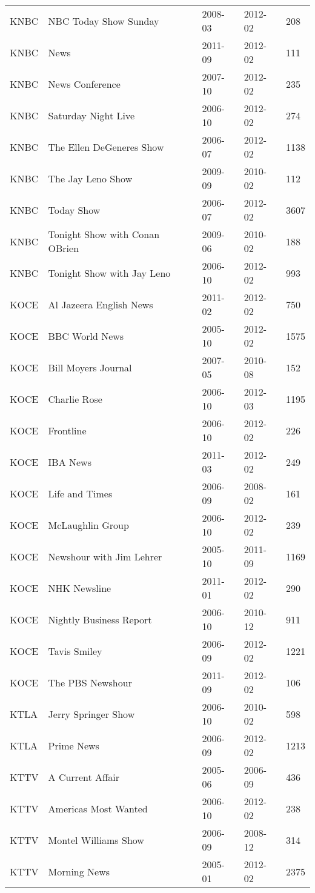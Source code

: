 \begin{longtable}{lllll}
KNBC & NBC Today Show Sunday & 2008-03 & 2012-02 & 208\\
KNBC & News & 2011-09 & 2012-02 & 111\\
KNBC & News Conference & 2007-10 & 2012-02 & 235\\
\addlinespace
KNBC & Saturday Night Live & 2006-10 & 2012-02 & 274\\
KNBC & The Ellen DeGeneres Show & 2006-07 & 2012-02 & 1138\\
KNBC & The Jay Leno Show & 2009-09 & 2010-02 & 112\\
KNBC & Today Show & 2006-07 & 2012-02 & 3607\\
KNBC & Tonight Show with Conan OBrien & 2009-06 & 2010-02 & 188\\
\addlinespace
KNBC & Tonight Show with Jay Leno & 2006-10 & 2012-02 & 993\\
KOCE & Al Jazeera English News & 2011-02 & 2012-02 & 750\\
KOCE & BBC World News & 2005-10 & 2012-02 & 1575\\
KOCE & Bill Moyers Journal & 2007-05 & 2010-08 & 152\\
KOCE & Charlie Rose & 2006-10 & 2012-03 & 1195\\
\addlinespace
KOCE & Frontline & 2006-10 & 2012-02 & 226\\
KOCE & IBA News & 2011-03 & 2012-02 & 249\\
KOCE & Life and Times & 2006-09 & 2008-02 & 161\\
KOCE & McLaughlin Group & 2006-10 & 2012-02 & 239\\
KOCE & Newshour with Jim Lehrer & 2005-10 & 2011-09 & 1169\\
\addlinespace
KOCE & NHK Newsline & 2011-01 & 2012-02 & 290\\
KOCE & Nightly Business Report & 2006-10 & 2010-12 & 911\\
KOCE & Tavis Smiley & 2006-09 & 2012-02 & 1221\\
KOCE & The PBS Newshour & 2011-09 & 2012-02 & 106\\
KTLA & Jerry Springer Show & 2006-10 & 2010-02 & 598\\
\addlinespace
KTLA & Prime News & 2006-09 & 2012-02 & 1213\\
KTTV & A Current Affair & 2005-06 & 2006-09 & 436\\
KTTV & Americas Most Wanted & 2006-10 & 2012-02 & 238\\
KTTV & Montel Williams Show & 2006-09 & 2008-12 & 314\\
KTTV & Morning News & 2005-01 & 2012-02 & 2375\\

\end{longtable}
